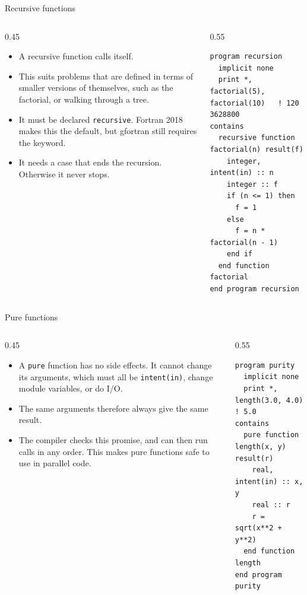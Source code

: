 \begin{frame}[fragile]{Recursive functions}
  \begin{columns}[T]
    \begin{column}{0.45\textwidth}
      \begin{itemize}
        \item A recursive function calls itself.
        \item This suits problems that are defined in terms of smaller versions of themselves, such as the factorial, or walking through a tree.
        \item It must be declared \texttt{recursive}. Fortran 2018 makes this the default, but gfortran still requires the keyword.
        \item It needs a case that ends the recursion. Otherwise it never stops.
      \end{itemize}
    \end{column}

    \begin{column}{0.55\textwidth}
      \begin{lstlisting}
program recursion
  implicit none
  print *, factorial(5), factorial(10)   ! 120  3628800
contains
  recursive function factorial(n) result(f)
    integer, intent(in) :: n
    integer :: f
    if (n <= 1) then
      f = 1
    else
      f = n * factorial(n - 1)
    end if
  end function factorial
end program recursion
      \end{lstlisting}
    \end{column}
  \end{columns}
\end{frame}


\begin{frame}[fragile]{Pure functions}
  \begin{columns}[T]
    \begin{column}{0.45\textwidth}
      \begin{itemize}
        \item A \texttt{pure} function has no side effects. It cannot change its arguments, which must all be \texttt{intent(in)}, change module variables, or do I/O.
        \item The same arguments therefore always give the same result.
        \item The compiler checks this promise, and can then run calls in any order. This makes pure functions safe to use in parallel code.
      \end{itemize}
    \end{column}

    \begin{column}{0.55\textwidth}
      \begin{lstlisting}
program purity
  implicit none
  print *, length(3.0, 4.0)   ! 5.0
contains
  pure function length(x, y) result(r)
    real, intent(in) :: x, y
    real :: r
    r = sqrt(x**2 + y**2)
  end function length
end program purity
      \end{lstlisting}
    \end{column}
  \end{columns}
\end{frame}


